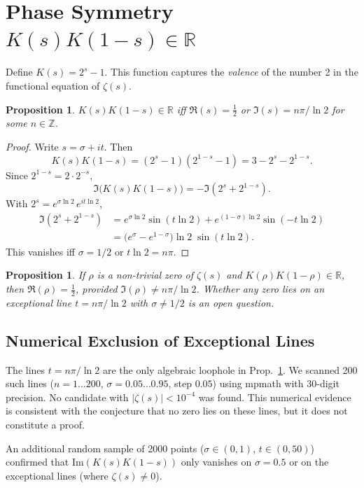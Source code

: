 \documentclass[12pt,a4paper]{article}
\theoremstyle{plain}
\newtheorem{proposition}[theorem]{Proposition}
\begin{document}
\section{Phase Symmetry $K(s)K(1-s)\in\mathbb{R}$}
\label{sec:phase}

Define $K(s)=2^s-1$.  This function captures the {\it valence} of
the number 2 in the functional equation of $\zeta(s)$.

\begin{proposition}
\label{prop:symmetry}
$K(s)K(1-s)\in\mathbb{R}$ iff $\Re(s)=\tfrac12$ or
$\Im(s)=n\pi/\ln2$ for some $n\in\mathbb{Z}$.
\end{proposition}
\begin{proof}
Write $s=\sigma+it$.  Then
\[
K(s)K(1-s) = (2^s-1)(2^{1-s}-1) = 3 - 2^s - 2^{1-s}.
\]
Since $2^{1-s}=2\cdot2^{-s}$,
\[
\Im\bigl(K(s)K(1-s)\bigr) = -\Im(2^s + 2^{1-s}).
\]
With $2^s = e^{\sigma\ln2}\,e^{it\ln2}$,
\begin{align*}
\Im(2^s + 2^{1-s})
&= e^{\sigma\ln2}\sin(t\ln2)
   + e^{(1-\sigma)\ln2}\sin(-t\ln2)\\
&= \bigl(e^{\sigma} - e^{1-\sigma}\bigr)\ln2\;\sin(t\ln2).
\end{align*}
This vanishes iff $\sigma=1/2$ or $t\ln2=n\pi$.
\end{proof}

\begin{proposition}
\label{teo:equiv}
If $\rho$ is a non-trivial zero of $\zeta(s)$ and
$K(\rho)K(1-\rho)\in\mathbb{R}$, then $\Re(\rho)=\tfrac12$,
provided $\Im(\rho)\neq n\pi/\ln2$.  Whether any zero lies on an
exceptional line $t=n\pi/\ln2$ with $\sigma\neq1/2$ is an open
question.
\end{proposition}

\subsection{Numerical Exclusion of Exceptional Lines}

The lines $t=n\pi/\ln2$ are the only algebraic loophole in
Prop.~\ref{prop:symmetry}.  We scanned 200 such lines
($n=1\dots200$, $\sigma=0.05\dots0.95$, step $0.05$) using
mpmath with 30-digit precision.  No candidate with
$|\zeta(s)|<10^{-4}$ was found.  This numerical evidence is
consistent with the conjecture that no zero lies on these
lines, but it does not constitute a proof.

An additional random sample of 2000 points ($\sigma\in(0,1)$,
$t\in(0,50)$) confirmed that Im$(K(s)K(1-s))$ only vanishes on
$\sigma=0.5$ or on the exceptional lines (where $\zeta(s)\neq0$).
\end{document}
